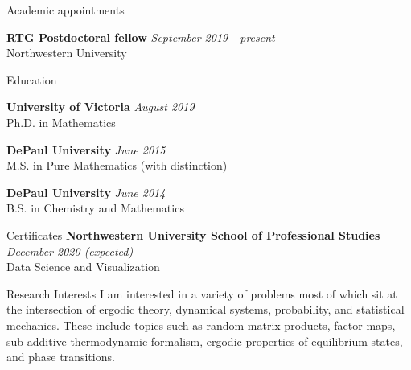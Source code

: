 \documentclass{resume} %
\begin{document}
	
\begin{rSection}{Academic appointments}
	
	{\bf RTG Postdoctoral fellow} \hfill {\em September 2019 - present} \\ 
	Northwestern University
	
\end{rSection}


\begin{rSection}{Education}
	
{\bf University of Victoria} \hfill {\em August 2019} \\ 
Ph.D. in Mathematics
	
{\bf DePaul University} \hfill {\em June 2015} \\ 
M.S. in Pure Mathematics (with distinction)	

{\bf DePaul University} \hfill {\em June 2014} \\ 
B.S. in Chemistry and Mathematics 

\end{rSection}

\begin{rSection}{Certificates}
	{\bf Northwestern University School of Professional Studies} \hfill {\em December 2020 (expected)} \\ 
	Data Science and Visualization
\end{rSection}

\begin{rSection}{Research Interests}
	I am interested in a variety of problems most of which sit at the intersection of ergodic theory, dynamical systems, probability, and statistical mechanics. These include topics such as random matrix products, factor maps, sub-additive thermodynamic formalism, ergodic properties of equilibrium states, and phase transitions.
\end{rSection}
\end{document}
